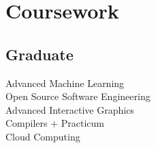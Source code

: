 \documentclass[]{azhagu-swe-resume-openfont}
\begin{document}
\begin{minipage}[t]{0.33\textwidth}
\section{Coursework}
\subsection{Graduate}
Advanced Machine Learning \\
Open Source Software Engineering \\
Advanced Interactive Graphics \\
Compilers + Practicum \\
Cloud Computing \\
\sectionsep


\end{minipage} 
\hfill
\end{document}

